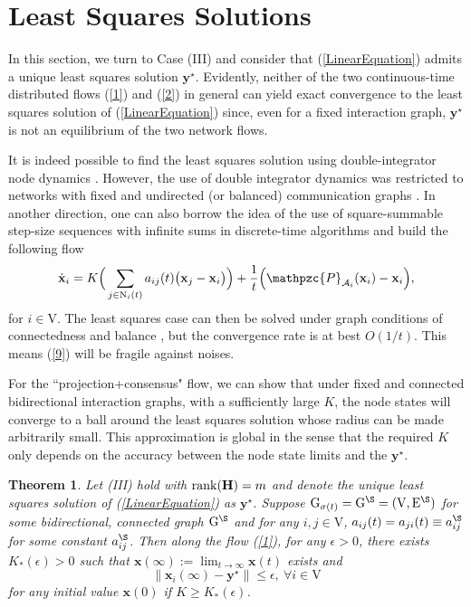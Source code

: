 \documentclass[a4paper, 11pt]{article}
\newtheorem{theorem}{Theorem}
\begin{document}
\section{Least Squares Solutions}\label{Sec:least-squares}

In this section, we turn to  Case  (III) and consider that (\ref{LinearEquation}) admits a unique least squares solution $\mathbf{y}^\star$. Evidently, neither of the two continuous-time distributed flows (\ref{1}) and (\ref{2}) in general can yield exact convergence to the least squares solution of (\ref{LinearEquation}) since, even for a fixed interaction graph, $\mathbf{y}^\star$ is not an equilibrium of the two network flows.


It is indeed possible to find the least squares solution using  double-integrator node dynamics \cite{elia,cotes14}.  However, the use of double integrator dynamics was  restricted to   networks with fixed and undirected (or balanced) communication graphs \cite{elia,cotes14}. In another direction,  one can also borrow the idea of  the use of    square-summable step-size sequences with infinite sums in discrete-time algorithms \cite{nedic10} and  build the following flow
\begin{align}\label{9}
\dot{\mathbf{x}}_i =K\Big( \sum_{j\in \mathrm{N}_i(t)}a_{ij}(t)\big(\mathbf{x}_j-\mathbf{x}_i\big) \Big)+ \frac{1}{t}\Big(\mathpzc{P}_{\mathcal{A}_i}(\mathbf{x}_i)-\mathbf{x}_i\Big),
\end{align}
for $i\in\mathrm{V}$.
The least squares case can then be solved under graph conditions of connectedness and balance \cite{nedic10}, but the convergence rate is at best $O(1/t)$. This means (\ref{9}) will be fragile against noises.



For the ``projection+consensus" flow, we can show that under fixed and connected bidirectional interaction graphs,  with a sufficiently large $K$, the node states will converge to  a ball around the least squares solution whose radius can be made arbitrarily small. This approximation is global in the sense that the required $K$ only depends on the accuracy between the node state limits and the $\mathbf{y}^\star$.
\begin{theorem}\label{thm5}
Let (III) hold with ${\rm rank}{(\mathbf{H})}=m$ and  denote the unique least squares solution of (\ref{LinearEquation}) as $\mathbf{y}^\star$.  Suppose $\mathrm{G}_{\sigma(t)}=\mathrm{G}^\S=(\mathrm{V}, \mathrm{E}^\S)$ for some bidirectional, connected graph $\mathrm{G}^\S$ and for any $i,j\in\mathrm{V}$, $a_{ij}(t)=a_{ji}(t)\equiv a_{ij}^\S$ for some constant $a_{ij}^\S$. Then   along  the flow (\ref{1}), for any $\epsilon>0$, there exists $K_\ast(\epsilon)>0$ such that $\mathbf{x}(\infty):=\lim_{t\to \infty}\mathbf{x}(t)$ exists and
 $$
 \big\|\mathbf{x}_i(\infty)-\mathbf{y}^\star\big\|\leq \epsilon,\  \forall i\in\mathrm{V}
$$
for any initial value $\mathbf{x}(0)$ if $K\geq K_\ast(\epsilon)$.
\end{theorem}
\end{document}
